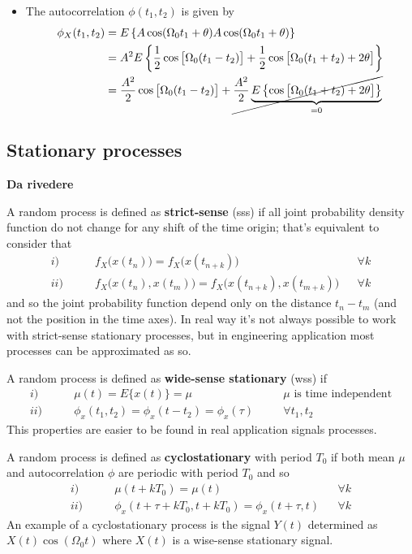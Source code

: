 \begin{itemize}
		\item The autocorrelation $\phi(t_1,t_2)$ is given by
		\begin{align*}
			\phi_X(t_1,t_2) & = E\left\{ A\cos(\Omega_0 t_1 + \theta) A\cos(\Omega_0 t_1 + \theta) \right\} \\
			& = A^2 E \left\{ \frac 1 2 \cos\big[\Omega_0 (t_1-t_2)\big] + \frac 1 2 \cos \big[ \Omega_0(t_1+t_2) + 2\theta \big] \right\} \\
			& = \frac {A^2}2 \cos\big[ \Omega_0(t_1-t_2) \big] + \cancel{\frac {A^2} 2 \underbrace{E\left\{ \cos \big[ \Omega_0(t_1+t_2) + 2\theta\big]  \right\}}_{=0}}
		\end{align*}
	
	\end{itemize}
	
\subsection{Stationary processes}
	\textbf{Da rivedere}
	
	A random process is defined as \textbf{strict-sense}  (sss) if all joint probability density function do not change for any shift of the time origin; that's equivalent to consider that
	\begin{align*}
		i) & \qquad f_X \big(x(t_n)\big) = f_X\big(x(t_{n+k})\big) && \forall k \\
		ii)& \qquad f_X\big(x(t_n),x(t_m)\big) = f_X\big(x(t_{n+k}), x(t_{m+k})\big)  && \forall k 
	\end{align*}
	and so the joint probability function depend only on the distance $t_n-t_m$ (and not the position in the time axes). In real way it's not always possible to work with strict-sense stationary processes, but in engineering application most processes can be approximated as so.
	
	A random process is defined as \textbf{wide-sense stationary} (wss) if 
	\begin{align*}
		i)& \qquad \mu(t)= E\{x(t)\} = \mu \quad && \textrm{$\mu$ is time independent} \\
		ii)& \qquad \phi_x(t_1,t_2) = \phi_x(t-t_2) = \phi_x(\tau) \quad && \forall t_1,t_2
	\end{align*}
	This properties are easier to be found in real application signals processes.
	
	A random process is defined as \textbf{cyclostationary} with period $T_0$ if both mean $\mu$ and autocorrelation $\phi$ are periodic with period $T_0$ and so
	\begin{align*}
		i)& \qquad \mu(t + kT_0)= \mu(t)\quad && \forall k \\
		ii)& \qquad \phi_x(t + \tau + kT_0,t + kT_0) = \phi_x(t+\tau, t) && \forall k
	\end{align*}
	An example of a cyclostationary process is the signal $Y(t)$ determined as $X(t) \cos(\Omega_0t)$ where $X(t)$ is a wise-sense stationary signal.
	
